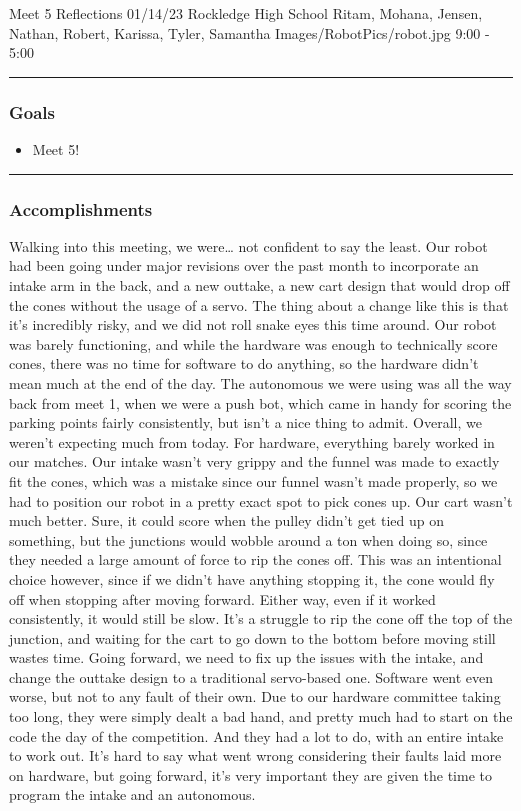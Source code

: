         \insertmeeting 
	{Meet 5 Reflections} 
	{01/14/23} 
	{Rockledge High School}
	{Ritam, Mohana, Jensen, Nathan, Robert, Karissa, Tyler, Samantha}
	{Images/RobotPics/robot.jpg}
	{9:00 - 5:00}
	
\noindent\hfil\rule{\textwidth}{.4pt}\hfil
\subsubsection*{Goals}
\begin{itemize}
    \item Meet 5!

\end{itemize} 

\noindent\hfil\rule{\textwidth}{.4pt}\hfil

\subsubsection*{Accomplishments}
Walking into this meeting, we were… not confident to say the least. Our robot had been going under major revisions over the past month to incorporate an intake arm in the back, and a new outtake, a new cart design that would drop off the cones without the usage of a servo. The thing about a change like this is that it’s incredibly risky, and we did not roll snake eyes this time around. Our robot was barely functioning, and while the hardware was enough to technically score cones, there was no time for software to do anything, so the hardware didn’t mean much at the end of the day. The autonomous we were using was all the way back from meet 1, when we were a push bot, which came in handy for scoring the parking points fairly consistently, but isn’t a nice thing to admit. Overall, we weren’t expecting much from today.
For hardware, everything barely worked in our matches. Our intake wasn’t very grippy and the funnel was made to exactly fit the cones, which was a mistake since our funnel wasn’t made properly, so we had to position our robot in a pretty exact spot to pick cones up. Our cart wasn’t much better. Sure, it could score when the pulley didn’t get tied up on something, but the junctions would wobble around a ton when doing so, since they needed a large amount of force to rip the cones off. This was an intentional choice however, since if we didn’t have anything stopping it, the cone would fly off when stopping after moving forward. Either way, even if it worked consistently, it would still be slow. It’s a struggle to rip the cone off the top of the junction, and waiting for the cart to go down to the bottom before moving still wastes time. Going forward, we need to fix up the issues with the intake, and change the outtake design to a traditional servo-based one.
Software went even worse, but not to any fault of their own. Due to our hardware committee taking too long, they were simply dealt a bad hand, and pretty much had to start on the code the day of the competition. And they had a lot to do, with an entire intake to work out. It’s hard to say what went wrong considering their faults laid more on hardware, but going forward, it’s very important they are given the time to program the intake and an autonomous.

